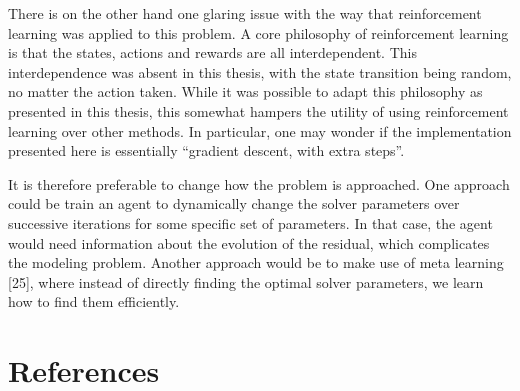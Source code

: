 \documentclass[
  letterpaper,
]{report}
\theoremstyle{definition}
\theoremstyle{plain}
\theoremstyle{definition}
\theoremstyle{remark}
\begin{document}
There is on the other hand one glaring issue with the way that
reinforcement learning was applied to this problem. A core philosophy of
reinforcement learning is that the states, actions and rewards are all
interdependent. This interdependence was absent in this thesis, with the
state transition being random, no matter the action taken. While it was
possible to adapt this philosophy as presented in this thesis, this
somewhat hampers the utility of using reinforcement learning over other
methods. In particular, one may wonder if the implementation presented
here is essentially ``gradient descent, with extra steps''.

It is therefore preferable to change how the problem is approached. One
approach could be train an agent to dynamically change the solver
parameters over successive iterations for some specific set of
parameters. In that case, the agent would need information about the
evolution of the residual, which complicates the modeling problem.
Another approach would be to make use of meta learning {[}25{]}, where
instead of directly finding the optimal solver parameters, we learn how
to find them efficiently.


\chapter*{References}\label{references}

\end{document}
